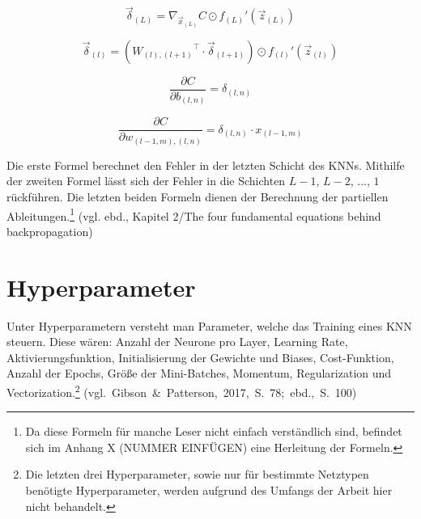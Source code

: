 \documentclass[a4paper,12pt,ngerman,oneside]{scrreprt}	%
\begin{document}
			\begin{equation}\label{BP1}
				\vec{\delta}_{(L)} = \nabla_{\vec{x}_{(L)}}C \odot f_{(L)}\prime (\vec{z}_{(L)})
			\end{equation}
			
			\begin{equation}\label{BP2}
				\vec{\delta}_{(l)} = ({W_{(l),(l+1)}}^\intercal \cdot \vec{\delta}_{(l+1)}) \odot f_{(l)}\prime (\vec{z}_{(l)})
			\end{equation}
			
			\begin{equation}\label{BP3}
				\frac{\partial C}{\partial b_{(l,n)}} = \delta_{(l,n)}
			\end{equation}
			
			\begin{equation}\label{BP4}
				\frac{\partial C}{\partial w_{(l-1,m), (l,n)}} = \delta_{(l,n)} \cdot x_{(l-1,m)}
			\end{equation}
			
			Die erste Formel berechnet den Fehler in der letzten Schicht des KNNs. Mithilfe der zweiten Formel lässt sich der Fehler in die Schichten $L-1$, $L-2$, ..., $1$ rückführen. Die letzten beiden Formeln dienen der Berechnung der partiellen Ableitungen.\footnote{Da diese Formeln für manche Leser nicht einfach verständlich sind, befindet sich im Anhang X (NUMMER EINFÜGEN) eine Herleitung der Formeln. } (vgl. ebd., Kapitel 2/The four fundamental equations behind backpropagation)


			\newpage
		\section{Hyperparameter} \label{Hyperparameter}
			Unter Hyperparametern versteht man Parameter, welche das Training eines KNN steuern. Diese wären: Anzahl der Neurone pro Layer, Learning Rate, Aktivierungsfunktion, Initialisierung der Gewichte und Biases, Cost-Funktion, Anzahl der Epochs, Größe der Mini-Batches, Momentum, Regularization und Vectorization.\footnote{Die letzten drei Hyperparameter, sowie nur für bestimmte Netztypen benötigte Hyperparameter, werden aufgrund des Umfangs der Arbeit hier nicht behandelt.} \newline \mbox{(vgl. Gibson \& Patterson, 2017, S. 78; ebd., S. 100)}
\end{document}
